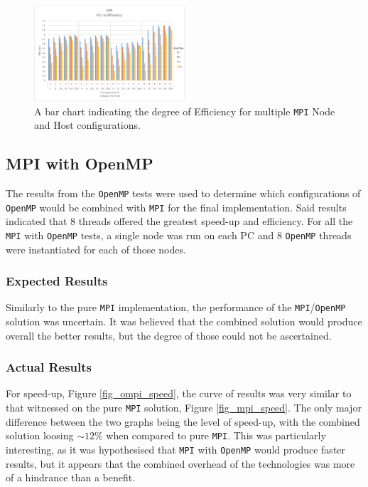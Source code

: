 \documentclass[journal,transmag]{IEEEtran}
\begin{document}
		\begin{figure}[h]
			\centering
			\includegraphics[width = 0.5\textwidth]{chartMPIEff}
			\caption{A bar chart indicating the degree of Efficiency for multiple \texttt{MPI} Node and Host configurations.}
			\label{fig_mpi_eff}
		\end{figure}

	\subsection{MPI with OpenMP}
		The results from the \texttt{OpenMP} tests were used to determine which configurations of \texttt{OpenMP} would be combined with \texttt{MPI} for the final implementation. Said results indicated that 8 threads offered the greatest speed-up and efficiency. For all the \texttt{MPI} with \texttt{OpenMP} tests, a single node was run on each PC and 8 \texttt{OpenMP} threads were instantiated for each of those nodes.
		 
 		\subsubsection{Expected Results}
			Similarly to the pure \texttt{MPI} implementation, the performance of the \texttt{MPI}/\texttt{OpenMP} solution was uncertain. It was believed that the combined solution would produce overall the better results, but the degree of those could not be ascertained.
		
		\subsubsection{Actual Results}
			For speed-up, Figure \ref{fig_ompi_speed}, the curve of results was very similar to that witnessed on the pure \texttt{MPI} solution, Figure \ref{fig_mpi_speed}. The only major difference between the two graphs being the level of speed-up, with the combined solution loosing $\sim12\%$ when compared to pure \texttt{MPI}. This was particularly interesting, as it was hypothesised that \texttt{MPI} with \texttt{OpenMP} would produce faster results, but it appears that the combined overhead of the technologies was more of a hindrance than a benefit.
			
\end{document}
